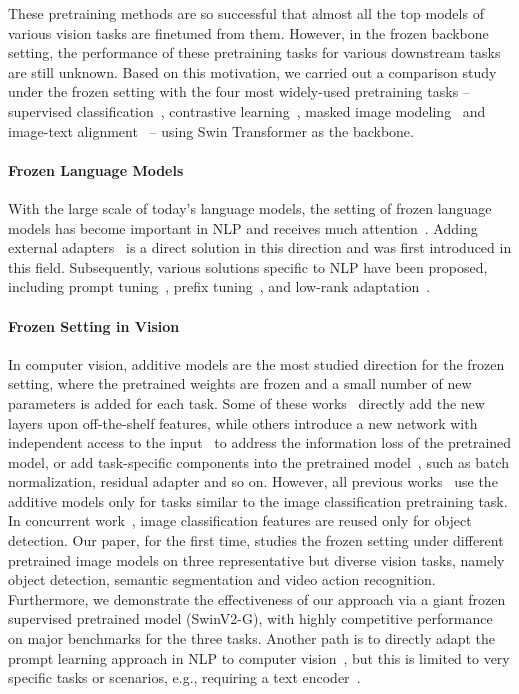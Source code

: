 \documentclass{article}
\begin{document}
These pretraining methods are so successful that almost all the top models of various vision tasks are finetuned from them. However, in the frozen backbone setting, the performance of these pretraining tasks for various downstream tasks are still unknown. 
Based on this motivation, we carried out a comparison study under the frozen setting with the four most widely-used pretraining tasks -- supervised classification~\cite{liu2021swin,swinv2}, contrastive learning~\cite{esvit},  masked image modeling~\cite{xie2021simmim} and image-text alignment~\cite{yixuan2022icar} -- using Swin Transformer as the backbone.

\paragraph{Frozen Language Models} With the large scale of today's language models, the setting of frozen language models has become important in NLP and receives much attention~\cite{liu2021pre}. Adding external adapters~\cite{houlsby2019parameter} is a direct solution in this direction and was first introduced in this field. Subsequently, various solutions specific to NLP have been proposed, including prompt tuning~\cite{lester2021power}, prefix tuning~\cite{li2021prefix}, and low-rank adaptation~\cite{hu2021lora}.

\paragraph{Frozen Setting in Vision} In computer vision, additive models are the most studied direction for the frozen setting, where the pretrained weights are frozen and a small number of new parameters is added for each task. Some of these works~\cite{donahue2014decaf,sharif2014cnn} directly add the new layers upon off-the-shelf features, while others introduce a new network with independent access to the input~\cite{rusu2016progressive,zhang2020side} to address the information loss of the pretrained model, or add task-specific components into the pretrained model~\cite{rebuffi2017resadapt,bilen2017universal,rebuffi2018multidomain}, such as batch normalization, residual adapter and so on. However, all previous works~\cite{bilen2017universal,rebuffi2017resadapt,rebuffi2018multidomain,zhang2020side} use the additive models only for tasks similar to the image classification pretraining task. In concurrent work~\cite{vasconcelos2022proper}, image classification features are reused only for object detection. Our paper, for the first time, studies the frozen setting under different pretrained image models on three representative but diverse vision tasks, namely object detection, semantic segmentation and video action recognition. Furthermore, we demonstrate the effectiveness of our approach via a giant frozen supervised pretrained model (SwinV2-G), with highly competitive performance on major benchmarks for the three tasks.
Another path is to directly adapt the prompt learning approach in NLP to computer vision~\cite{zhou2021vprompt,yao2021cpt}, but this is limited to very specific tasks or scenarios, e.g., requiring a text encoder~\cite{zhou2021vprompt}.
\end{document}
